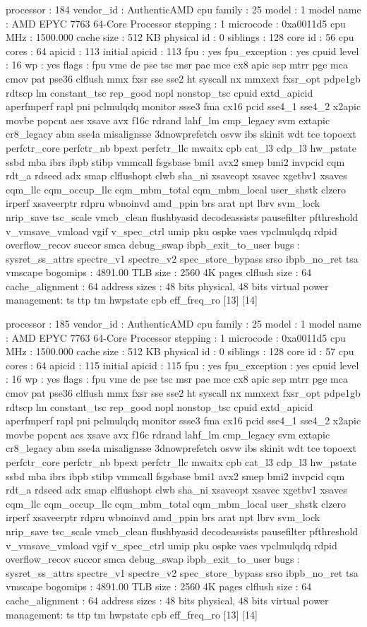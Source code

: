 processor	: 184
vendor_id	: AuthenticAMD
cpu family	: 25
model		: 1
model name	: AMD EPYC 7763 64-Core Processor
stepping	: 1
microcode	: 0xa0011d5
cpu MHz		: 1500.000
cache size	: 512 KB
physical id	: 0
siblings	: 128
core id		: 56
cpu cores	: 64
apicid		: 113
initial apicid	: 113
fpu		: yes
fpu_exception	: yes
cpuid level	: 16
wp		: yes
flags		: fpu vme de pse tsc msr pae mce cx8 apic sep mtrr pge mca cmov pat pse36 clflush mmx fxsr sse sse2 ht syscall nx mmxext fxsr_opt pdpe1gb rdtscp lm constant_tsc rep_good nopl nonstop_tsc cpuid extd_apicid aperfmperf rapl pni pclmulqdq monitor ssse3 fma cx16 pcid sse4_1 sse4_2 x2apic movbe popcnt aes xsave avx f16c rdrand lahf_lm cmp_legacy svm extapic cr8_legacy abm sse4a misalignsse 3dnowprefetch osvw ibs skinit wdt tce topoext perfctr_core perfctr_nb bpext perfctr_llc mwaitx cpb cat_l3 cdp_l3 hw_pstate ssbd mba ibrs ibpb stibp vmmcall fsgsbase bmi1 avx2 smep bmi2 invpcid cqm rdt_a rdseed adx smap clflushopt clwb sha_ni xsaveopt xsavec xgetbv1 xsaves cqm_llc cqm_occup_llc cqm_mbm_total cqm_mbm_local user_shstk clzero irperf xsaveerptr rdpru wbnoinvd amd_ppin brs arat npt lbrv svm_lock nrip_save tsc_scale vmcb_clean flushbyasid decodeassists pausefilter pfthreshold v_vmsave_vmload vgif v_spec_ctrl umip pku ospke vaes vpclmulqdq rdpid overflow_recov succor smca debug_swap ibpb_exit_to_user
bugs		: sysret_ss_attrs spectre_v1 spectre_v2 spec_store_bypass srso ibpb_no_ret tsa vmscape
bogomips	: 4891.00
TLB size	: 2560 4K pages
clflush size	: 64
cache_alignment	: 64
address sizes	: 48 bits physical, 48 bits virtual
power management: ts ttp tm hwpstate cpb eff_freq_ro [13] [14]

processor	: 185
vendor_id	: AuthenticAMD
cpu family	: 25
model		: 1
model name	: AMD EPYC 7763 64-Core Processor
stepping	: 1
microcode	: 0xa0011d5
cpu MHz		: 1500.000
cache size	: 512 KB
physical id	: 0
siblings	: 128
core id		: 57
cpu cores	: 64
apicid		: 115
initial apicid	: 115
fpu		: yes
fpu_exception	: yes
cpuid level	: 16
wp		: yes
flags		: fpu vme de pse tsc msr pae mce cx8 apic sep mtrr pge mca cmov pat pse36 clflush mmx fxsr sse sse2 ht syscall nx mmxext fxsr_opt pdpe1gb rdtscp lm constant_tsc rep_good nopl nonstop_tsc cpuid extd_apicid aperfmperf rapl pni pclmulqdq monitor ssse3 fma cx16 pcid sse4_1 sse4_2 x2apic movbe popcnt aes xsave avx f16c rdrand lahf_lm cmp_legacy svm extapic cr8_legacy abm sse4a misalignsse 3dnowprefetch osvw ibs skinit wdt tce topoext perfctr_core perfctr_nb bpext perfctr_llc mwaitx cpb cat_l3 cdp_l3 hw_pstate ssbd mba ibrs ibpb stibp vmmcall fsgsbase bmi1 avx2 smep bmi2 invpcid cqm rdt_a rdseed adx smap clflushopt clwb sha_ni xsaveopt xsavec xgetbv1 xsaves cqm_llc cqm_occup_llc cqm_mbm_total cqm_mbm_local user_shstk clzero irperf xsaveerptr rdpru wbnoinvd amd_ppin brs arat npt lbrv svm_lock nrip_save tsc_scale vmcb_clean flushbyasid decodeassists pausefilter pfthreshold v_vmsave_vmload vgif v_spec_ctrl umip pku ospke vaes vpclmulqdq rdpid overflow_recov succor smca debug_swap ibpb_exit_to_user
bugs		: sysret_ss_attrs spectre_v1 spectre_v2 spec_store_bypass srso ibpb_no_ret tsa vmscape
bogomips	: 4891.00
TLB size	: 2560 4K pages
clflush size	: 64
cache_alignment	: 64
address sizes	: 48 bits physical, 48 bits virtual
power management: ts ttp tm hwpstate cpb eff_freq_ro [13] [14]

